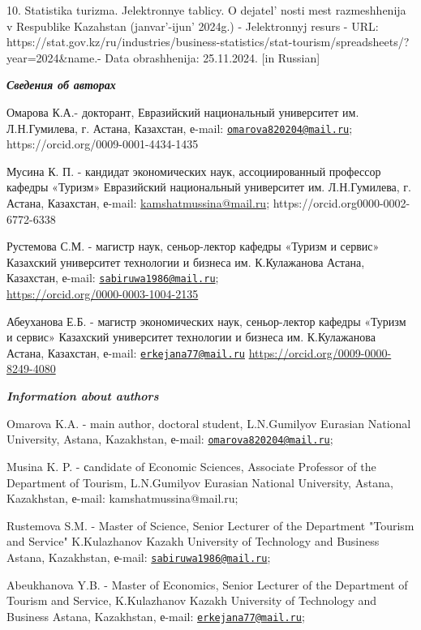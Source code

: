 10. Statistika turizma. Jelektronnye tablicy. O
dejatel' nosti mest razmeshhenija v Respublike Kazahstan
(janvar'-ijun'{} 2024g.) - Jelektronnyj
resurs - URL:
https://stat.gov.kz/ru/industries/business-statistics/stat-tourism/spreadsheets/?year=2024\&name.-
Data obrashhenija: 25.11.2024. {[}in Russian{]}

\emph{{\bfseries Сведения об авторах}}

{\bfseries \hfill\break
}Омарова К.А.- докторант, Евразийский национальный университет им.
Л.Н.Гумилева, г. Астана, Казахстан, е-mail:
\href{mailto:omarova820204@mail.ru}{\nolinkurl{omarova820204@mail.ru}};
https://orcid.org/0009-0001-4434-1435

Мусина К. П. - кандидат экономических наук, ассоциированный профессор
кафедры «Туризм» Евразийский национальный университет им. Л.Н.Гумилева,
г. Астана, Казахстан, е-mail:
\href{mailto:2kamshatmussina@mail.ru}{kamshatmussina@mail.ru};
https://orcid.org0000-0002-6772-6338

Рустемова С.М. - магистр наук, сеньор-лектор кафедры «Туризм и сервис»
Казахский университет технологии и бизнеса им. К.Кулажанова Астана,
Казахстан, е-mail:
\href{mailto:sabiruwa1986@mail.ru}{\nolinkurl{sabiruwa1986@mail.ru}};\\
\url{https://orcid.org/0000-0003-1004-2135}

Абеуханова Е.Б. - магистр экономических наук, сеньор-лектор кафедры
«Туризм и сервис» Казахский университет технологии и бизнеса им.
К.Кулажанова Астана, Казахстан, е-mail:
\href{mailto:erkejana77@mail.ru}{\nolinkurl{erkejana77@mail.ru}}
\url{https://orcid.org/0009-0000-8249-4080}

\emph{{\bfseries Information about authors}}

Omarova K.A. - main author, doctoral student, L.N.Gumilyov Eurasian
National University, Astana, Kazakhstan, е-mail:
\href{mailto:omarova820204@mail.ru}{\nolinkurl{omarova820204@mail.ru}};

Musina K. P. - сandidate of Economic Sciences, Associate Professor of
the Department of Tourism, L.N.Gumilyov Eurasian National University,
Astana, Kazakhstan, е-mail: kamshatmussina@mail.ru;

Rustemova S.M. - Master of Science, Senior Lecturer of the Department
"Tourism and Service" K.Kulazhanov Kazakh University of Technology and
Business Astana, Kazakhstan, е-mail:
\href{mailto:sabiruwa1986@mail.ru}{\nolinkurl{sabiruwa1986@mail.ru}};

Abeukhanova Y.B. - Master of Economics, Senior Lecturer of the
Department of Tourism and Service, K.Kulazhanov Kazakh University of
Technology and Business Astana, Kazakhstan, е-mail:
\href{mailto:erkejana77@mail.ru}{\nolinkurl{erkejana77@mail.ru}};